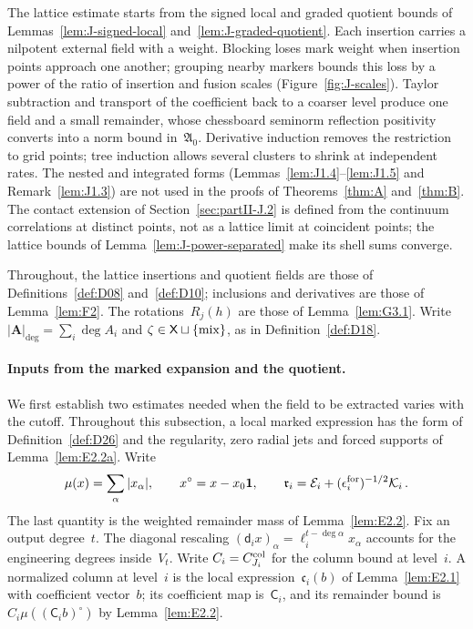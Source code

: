 The lattice estimate starts from the signed local and graded quotient bounds of Lemmas~\ref{lem:J-signed-local} and~\ref{lem:J-graded-quotient}. Each insertion carries a nilpotent external field with a weight. Blocking loses mark weight when insertion points approach one another; grouping nearby markers bounds this loss by a power of the ratio of insertion and fusion scales (Figure~\ref{fig:J-scales}). Taylor subtraction and transport of the coefficient back to a coarser level produce one field and a small remainder, whose chessboard seminorm reflection positivity converts into a norm bound in~$\mathfrak A_0$. Derivative induction removes the restriction to grid points; tree induction allows several clusters to shrink at independent rates. The nested and integrated forms (Lemmas~\ref{lem:J1.4}--\ref{lem:J1.5} and Remark~\ref{lem:J1.3}) are not used in the proofs of Theorems~\ref{thm:A} and~\ref{thm:B}. The contact extension of Section~\ref{sec:partII-J.2} is defined from the continuum correlations at distinct points, not as a lattice limit at coincident points; the lattice bounds of Lemma~\ref{lem:J-power-separated} make its shell sums converge.

Throughout, the lattice insertions and quotient fields are those of Definitions~\ref{def:D08} and~\ref{def:D10}; inclusions and derivatives are those of Lemma~\ref{lem:F2}. The rotations~$R_j(h)$ are those of Lemma~\ref{lem:G3.1}. Write $|\boldsymbol A|_{\deg}=\sum_i\deg A_i$ and $\zeta\in\mathsf{X}\sqcup\{\mathrm{mix}\}$, as in Definition~\ref{def:D18}.

\paragraph{Inputs from the marked expansion and the quotient.}

We first establish two estimates needed when the field to be extracted varies with the cutoff. Throughout this subsection, a local marked expression has the form of Definition~\ref{def:D26} and the regularity, zero radial jets and forced supports of Lemma~\ref{lem:E2.2a}. Write
\begin{equation*}
\mu(x)=\sum_\alpha|x_\alpha|,\qquad x^\circ=x-x_0\mathbf1,
\qquad \mathfrak r_i=\mathcal E_i+(\epsilon_i^{\rm for})^{-1/2}\mathcal K_i\,.
\end{equation*}
The last quantity is the weighted remainder mass of Lemma~\ref{lem:E2.2}. Fix an output degree~$t$. The diagonal rescaling $(\mathsf d_i x)_\alpha=\ell_i^{t-\deg\alpha}x_\alpha$ accounts for the engineering degrees inside~$V_t$. Write $C_i=C^{\rm col}_{J_i}$ for the column bound at level~$i$. A normalized column at level~$i$ is the local expression~$\mathfrak c_i(b)$ of Lemma~\ref{lem:E2.1} with coefficient vector~$b$; its coefficient map is~$\mathsf C_i$, and its remainder bound is $C_i\mu((\mathsf C_i b)^\circ)$ by Lemma~\ref{lem:E2.2}.

